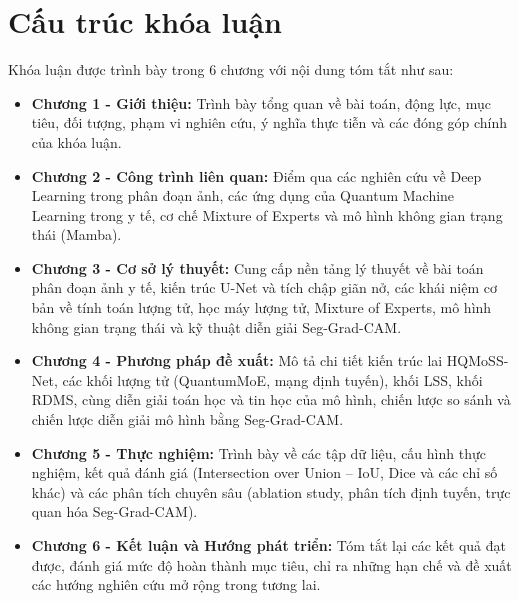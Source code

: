 \section{Cấu trúc khóa luận}
Khóa luận được trình bày trong 6 chương với nội dung tóm tắt như sau:
\begingroup
{}
\begin{itemize}[itemsep=3pt, topsep=3pt, parsep=0pt]
    \item \textbf{Chương 1 - Giới thiệu:} Trình bày tổng quan về bài toán, động lực, mục tiêu, đối tượng, phạm vi nghiên cứu, ý nghĩa thực tiễn và các đóng góp chính của khóa luận.
    \item \textbf{Chương 2 - Công trình liên quan:} Điểm qua các nghiên cứu về Deep Learning trong phân đoạn ảnh, các ứng dụng của Quantum Machine Learning trong y tế, cơ chế Mixture of Experts và mô hình không gian trạng thái (Mamba).
    \item \textbf{Chương 3 - Cơ sở lý thuyết:} Cung cấp nền tảng lý thuyết về bài toán phân đoạn ảnh y tế, kiến trúc U-Net và tích chập giãn nở, các khái niệm cơ bản về tính toán lượng tử, học máy lượng tử, Mixture of Experts, mô hình không gian trạng thái và kỹ thuật diễn giải Seg-Grad-CAM.
    \item \textbf{Chương 4 - Phương pháp đề xuất:} Mô tả chi tiết kiến trúc lai HQMoSS-Net, các khối lượng tử (QuantumMoE, mạng định tuyến), khối LSS, khối RDMS, cùng diễn giải toán học và tin học của mô hình, chiến lược so sánh và chiến lược diễn giải mô hình bằng Seg-Grad-CAM.
    \item \textbf{Chương 5 - Thực nghiệm:} Trình bày về các tập dữ liệu, cấu hình thực nghiệm, kết quả đánh giá (Intersection over Union -- IoU, Dice và các chỉ số khác) và các phân tích chuyên sâu (ablation study, phân tích định tuyến, trực quan hóa Seg-Grad-CAM).
    \item \textbf{Chương 6 - Kết luận và Hướng phát triển:} Tóm tắt lại các kết quả đạt được, đánh giá mức độ hoàn thành mục tiêu, chỉ ra những hạn chế và đề xuất các hướng nghiên cứu mở rộng trong tương lai.
\end{itemize}
\endgroup
